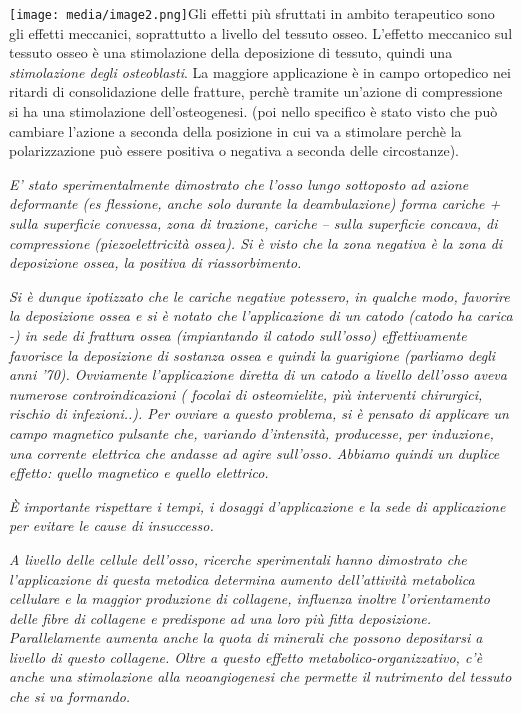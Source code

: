 \documentclass[]{article}
\begin{document}
\texttt{[image: media/image2.png]}Gli
effetti più sfruttati in ambito terapeutico sono gli effetti meccanici,
soprattutto a livello del tessuto osseo. L'effetto meccanico sul tessuto
osseo è una stimolazione della deposizione di tessuto, quindi una
\emph{\emph{stimolazione degli osteoblasti}}. La maggiore applicazione è
in campo ortopedico nei ritardi di consolidazione delle fratture, perchè
tramite un'azione di compressione si ha una stimolazione
dell'osteogenesi. (poi nello specifico è stato visto che può cambiare
l'azione a seconda della posizione in cui va a stimolare perchè la
polarizzazione può essere positiva o negativa a seconda delle
circostanze).

\emph{E' stato sperimentalmente dimostrato che l'osso lungo sottoposto
ad azione deformante (es flessione, anche solo durante la deambulazione)
forma cariche + sulla superficie convessa, zona di trazione, cariche --
sulla superficie concava, di compressione (piezoelettricità ossea). Si è
visto che la zona negativa è la zona di deposizione ossea, la positiva
di riassorbimento.}

\emph{Si è dunque ipotizzato che le cariche negative potessero, in
qualche modo, favorire la deposizione ossea e si è notato che
l'applicazione di un catodo (catodo ha carica -) in sede di frattura
ossea (impiantando il catodo sull'osso) effettivamente favorisce la
deposizione di sostanza ossea e quindi la guarigione (parliamo degli
anni '70). Ovviamente l'applicazione diretta di un catodo a livello
dell'osso aveva numerose controindicazioni ( focolai di osteomielite,
più interventi chirurgici, rischio di infezioni..). Per ovviare a questo
problema, si è pensato di applicare un campo magnetico pulsante che,
variando d'intensità, producesse, per induzione, una corrente elettrica
che andasse ad agire sull'osso. Abbiamo quindi un duplice effetto:
quello magnetico e quello elettrico.}

\emph{È importante rispettare i tempi, i dosaggi d'applicazione e la
sede di applicazione per evitare le cause di insuccesso.}

\emph{A livello delle cellule dell'osso, ricerche sperimentali hanno
dimostrato che l'applicazione di questa metodica determina aumento
dell'attività metabolica cellulare e la maggior produzione di collagene,
influenza inoltre l'orientamento delle fibre di collagene e predispone
ad una loro più fitta deposizione. Parallelamente aumenta anche la quota
di minerali che possono depositarsi a livello di questo collagene. Oltre
a questo effetto metabolico-organizzativo, c'è anche una stimolazione
alla neoangiogenesi che permette il nutrimento del tessuto che si va
formando.}
\end{document}
